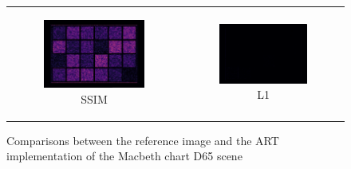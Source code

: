 \begin{figure}[h]
\begin{tabular}{cc}
\begin{subfigure}
			{0.4\textwidth}\centering\includegraphics[width=\linewidth]{img/macbeth_chart_D65_SSIM.png}
			\caption{SSIM}
		\end{subfigure} 
		&
		\begin{subfigure}
			{0.4\textwidth}\centering\includegraphics[width=\linewidth]{img/macbeth_chart_D65_L1.png}
			\caption{L1}
		\end{subfigure}
	\end{tabular}
	\caption{Comparisons between the reference image and the ART implementation of the Macbeth chart D65 scene}
	\label{fig:compare_macbeth_d65}
\end{figure}


